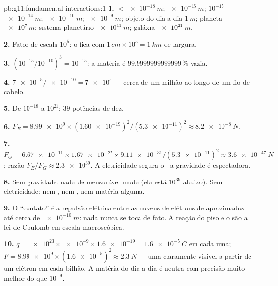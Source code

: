 \begin{solution}{pb:g11:fundamental-interactions:1}
\textbf{1.}  $< \qty{e-18}{m}$;  $\qty{e-15}{m}$; 
$10^{-15}$--$\qty{e-14}{m}$;  $\qty{e-10}{m}$; 
$\qty{e-9}{m}$; objeto do dia a dia $\qty{1}{m}$; planeta $\qty{e7}{m}$;
sistema planetário $\qty{e11}{m}$; galáxia $\qty{e21}{m}$.

\textbf{2.} Fator de escala $10^{5}$: o  fica com
$\qty{1}{cm} \times 10^{5} = \qty{1}{km}$ de largura.

\textbf{3.} $(10^{-15}/10^{-10})^3 = 10^{-15}$: a matéria é
$\num{99.9999999999999}\,\%$ vazia.

\textbf{4.} $\num{7e-5}/\num{e-10} = \num{7e5}$  --- cerca de um
milhão ao longo de um fio de cabelo.

\textbf{5.} De $10^{-18}$ a $10^{21}$: $39$ potências de dez.

\textbf{6.} $F_E = \num{8.99e9} \times (\num{1.60e-19})^2 /
(\num{5.3e-11})^2 \approx \qty{8.2e-8}{N}$.

\textbf{7.} $F_G = \num{6.67e-11} \times \num{1.67e-27} \times
\num{9.11e-31}/(\num{5.3e-11})^2 \approx \qty{3.6e-47}{N}$; razão
$F_E/F_G \approx \num{2.3e39}$. A eletricidade segura o ; a
gravidade é espectadora.

\textbf{8.} Sem gravidade: nada de mensurável muda (ela está $10^{39}$
abaixo). Sem eletricidade: nem , nem , nem matéria
alguma.

\textbf{9.} O ``contato'' é a repulsão elétrica entre as nuvens de
elétrons de  aproximados até cerca de $\qty{e-10}{m}$: nada nunca
se toca de fato. A reação do piso e o  são a lei de Coulomb em
escala macroscópica.

\textbf{10.} $q = \num{e23} \times \num{e-9} \times \num{1.6e-19} =
\qty{1.6e-5}{C}$ em cada uma;
$F = \num{8.99e9} \times (\num{1.6e-5})^2 \approx \qty{2.3}{N}$ --- uma
 claramente visível a partir de um elétron em cada bilhão. A matéria
do dia a dia é neutra com precisão muito melhor do que $10^{-9}$.


\end{solution}
